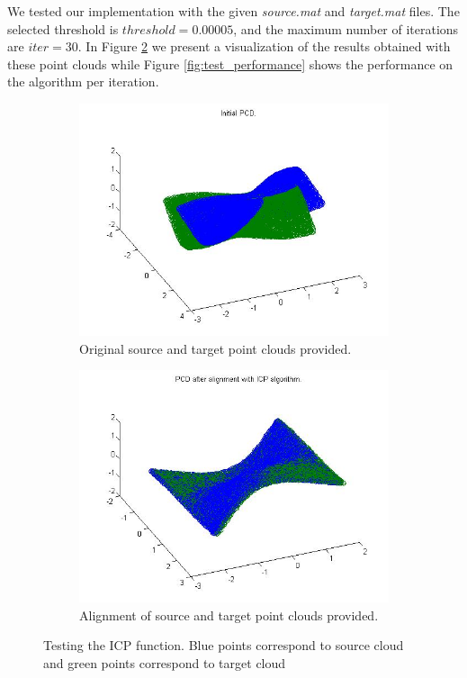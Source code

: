 \documentclass[11pt]{article}
\begin{document}
We tested our implementation with the given \textit{source.mat} and \textit{target.mat} files. The selected threshold is $ threshold = 0.00005 $, and the maximum number of iterations are $iter = 30$. In Figure \ref{fig:test} we present a visualization of the results obtained with these point clouds while Figure \ref{fig:test_performance} shows the performance on the algorithm per iteration.

\begin{figure}[H] \centering
	\begin{subfigure}{.5\textwidth} 
		\includegraphics[width=.9\textwidth]{img/initial_test.jpg}
		\caption{Original source and target point clouds provided.}
	\end{subfigure}%
	\begin{subfigure}{.5\textwidth} 
		\includegraphics[width=.9\textwidth]{img/test_clouds.jpg}
		\caption{Alignment of source and target point clouds provided.}
		\label{fig:test}
	\end{subfigure}
	\caption{Testing the ICP function. Blue points correspond to source cloud and green points correspond to target cloud}
\end{figure}
\end{document}
